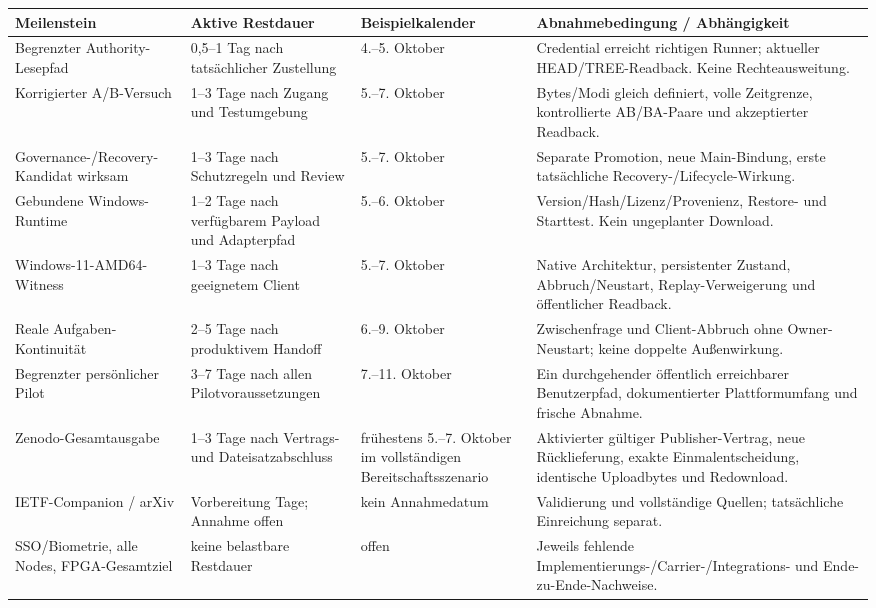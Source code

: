 {\tighttable
\begin{tabularx}{\textwidth}{@{}L{35mm}L{26mm}L{29mm}>{\raggedright\arraybackslash}X@{}}\toprule
Meilenstein & Aktive Restdauer & Beispielkalender & Abnahmebedingung / Abhängigkeit\\\midrule
Begrenzter Authority-Lesepfad & 0,5–1 Tag nach tatsächlicher Zustellung & 4.–5. Oktober & Credential erreicht richtigen Runner; aktueller HEAD/TREE-Readback. Keine Rechteausweitung.\\
Korrigierter A/B-Versuch & 1–3 Tage nach Zugang und Testumgebung & 5.–7. Oktober & Bytes/Modi gleich definiert, volle Zeitgrenze, kontrollierte AB/BA-Paare und akzeptierter Readback.\\
Governance-/Recovery-Kandidat wirksam & 1–3 Tage nach Schutzregeln und Review & 5.–7. Oktober & Separate Promotion, neue Main-Bindung, erste tatsächliche Recovery-/Lifecycle-Wirkung.\\
Gebundene Windows-Runtime & 1–2 Tage nach verfügbarem Payload und Adapterpfad & 5.–6. Oktober & Version/Hash/Lizenz/Provenienz, Restore- und Starttest. Kein ungeplanter Download.\\
Windows-11-AMD64-Witness & 1–3 Tage nach geeignetem Client & 5.–7. Oktober & Native Architektur, persistenter Zustand, Abbruch/Neustart, Replay-Verweigerung und öffentlicher Readback.\\
Reale Aufgaben-Kontinuität & 2–5 Tage nach produktivem Handoff & 6.–9. Oktober & Zwischenfrage und Client-Abbruch ohne Owner-Neustart; keine doppelte Außenwirkung.\\
Begrenzter persönlicher Pilot & 3–7 Tage nach allen Pilotvoraussetzungen & 7.–11. Oktober & Ein durchgehender öffentlich erreichbarer Benutzerpfad, dokumentierter Plattformumfang und frische Abnahme.\\
Zenodo-Gesamtausgabe & 1–3 Tage nach Vertrags- und Dateisatzabschluss & frühestens 5.–7. Oktober im vollständigen Bereitschaftsszenario & Aktivierter gültiger Publisher-Vertrag, neue Rücklieferung, exakte Einmalentscheidung, identische Uploadbytes und Redownload.\\
IETF-Companion / arXiv & Vorbereitung Tage; Annahme offen & kein Annahmedatum & Validierung und vollständige Quellen; tatsächliche Einreichung separat.\\
SSO/Biometrie, alle Nodes, FPGA-Gesamtziel & keine belastbare Restdauer & offen & Jeweils fehlende Implementierungs-/Carrier-/Integrations- und Ende-zu-Ende-Nachweise.\\\bottomrule
\end{tabularx}}
